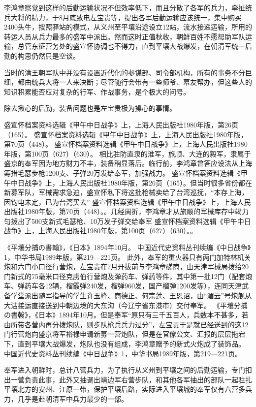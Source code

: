 \documentclass[12pt,UTF8]{ctexbook}
\begin{document}
李鸿章察觉到这样的后勤运输状况不但效率低下，而且分散了各军的兵力，牵扯统兵大将的精力，于8月底致电左宝贵等，提出各军后勤运输应该统一，集中购买2400头牛，按照驿站的模式，从义州至平壤沿途设立12站，流水接递运输，所用的转运人员从兵力最多的盛军中派出。然而这时正值秋收，朝鲜百姓不愿帮助军队运输，总管东征营务处的盛宣怀协调也不得力，直到平壤大战爆发，在朝清军统一后勤的构思仍然只是空谈。

当时的清王朝军队中并没有设置近代化的参谋部、司令部机构，所有的事务不分巨细，都由统兵大将一人来决断；尽管随行会带有一些师爷、幕友帮办，但这些人的知识积累能否应对复杂的行军、作战事务，是个极大的问号。

除去揪心的后勤，装备问题也是左宝贵极为操心的事情。

盛宣怀档案资料选辑《甲午中日战争》上，上海人民出版社1980年版，第26页（165）。
盛宣怀档案资料选辑《甲午中日战争》上，上海人民出版社1980年版，第70页（448）。
盛宣怀档案资料选辑《甲午中日战争》上，上海人民出版社1980年版，第100页（627）（630）。
相比驻防直隶的淮军，旅顺、大连的毅军，隶属于盛京的奉军因为地方财力不丰，装备稍显落后。临行前，李鸿章曾答应设法从上海筹措毛瑟步枪1200支、子弹20万发给奉军，加强战力。 盛宣怀档案资料选辑《甲午中日战争》上，上海人民出版社1980年版，第26页（165）。但当时很多省份都在新募军队，军械需求急迫，盛宣怀私下将这批枪械卖给了台湾巡抚，“本存上海，因钧电未定，已为台湾买去” 盛宣怀档案资料选辑《甲午中日战争》上，上海人民出版社1980年版，第70页（448）。。几经周折，李鸿章才从旅顺的军械库存中竭力匀拨出了500支新式毛瑟枪、10万发子弹交给奉军 盛宣怀档案资料选辑《甲午中日战争》上，上海人民出版社1980年版，第100页（627）（630）。。

《平壤分捕の書翰》，《日本》1894年10月。
中国近代史资料丛刊续编《中日战争》1，中华书局1989年版，第219—221页。
此外，奉军的重火器只有两门加特林机关炮和六门小口径行营炮，左宝贵在7月开拔前与李鸿章磋商，由天津军械局拨给20门新式的75毫米口径克虏伯行营炮及弹药车、弹药等件，其中第一批12门（配套炮车、弹药车各12辆，榴霰弹240发，榴弹960发，国产榴弹1200发等），连同天津武备学堂派出随军指导的学生许玉峰、商德正、何宗莲、王恩诏，由“湄云”号炮舰从大沽接运直接送到中朝边境的大东沟（今辽宁省东港市）交付奉军。 《平壤分捕の書翰》，《日本》1894年10月。但是奉军“原只有三千五百人，兵数本不甚多，若由所带各营内再分拨炮队，则步队枪兵兵力过分”，左宝贵于是就已经送到的这12门行营炮向盛京将军裕禄申请新募一营炮队，但是在官僚公文、汇报的层层拖宕下，直到平壤大战爆发，炮队也没有组成，李鸿章赠予的新式火炮成了装饰品。 中国近代史资料丛刊续编《中日战争》1，中华书局1989年版，第219—221页。

奉军进入朝鲜时，总计八营兵力，为了执行从义州到平壤之间的后勤运输，专门扣出一营负责此事，此外又抽调出靖边军右营步队，和其他各军抽出的部队一起驻扎平壤北方的安州、江原一带，保护平壤后路，实际进入平壤城的奉军仅有六营多兵力，几乎是赴朝清军中兵力最少的一部。
\end{document}
